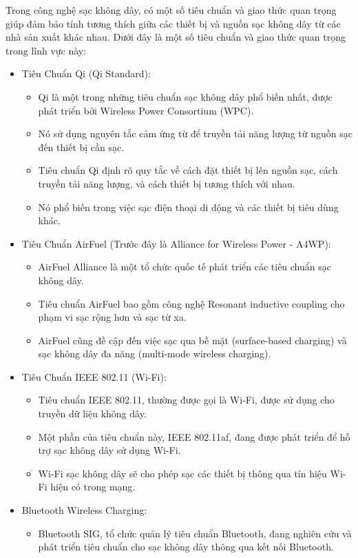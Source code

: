 \documentclass{article} %
\begin{document}
Trong công nghệ sạc không dây, có một số tiêu chuẩn và giao thức quan trọng giúp đảm bảo tính tương thích giữa các thiết bị và nguồn sạc không dây từ các nhà sản xuất khác nhau. Dưới đây là một số tiêu chuẩn và giao thức quan trọng trong lĩnh vực này:
\begin{itemize}
\item Tiêu Chuẩn Qi (Qi Standard):
\begin{itemize}
    \item Qi là một trong những tiêu chuẩn sạc không dây phổ biến nhất, được phát triển bởi Wireless Power Consortium (WPC).
\item Nó sử dụng nguyên tắc cảm ứng từ để truyền tải năng lượng từ nguồn sạc đến thiết bị cần sạc.
\item Tiêu chuẩn Qi định rõ quy tắc về cách đặt thiết bị lên nguồn sạc, cách truyền tải năng lượng, và cách thiết bị tương thích với nhau.
\item Nó phổ biến trong việc sạc điện thoại di động và các thiết bị tiêu dùng khác.
\end{itemize}
\item Tiêu Chuẩn AirFuel (Trước đây là Alliance for Wireless Power - A4WP):
\begin{itemize}
    \item AirFuel Alliance là một tổ chức quốc tế phát triển các tiêu chuẩn sạc không dây.
\item Tiêu chuẩn AirFuel bao gồm công nghệ Resonant inductive coupling cho phạm vi sạc rộng hơn và sạc từ xa.
\item AirFuel cũng đề cập đến việc sạc qua bề mặt (surface-based charging) và sạc không dây đa năng (multi-mode wireless charging).
\end{itemize}
\item Tiêu Chuẩn IEEE 802.11 (Wi-Fi):
\begin{itemize}
    \item Tiêu chuẩn IEEE 802.11, thường được gọi là Wi-Fi, được sử dụng cho truyền dữ liệu không dây.
\item Một phần của tiêu chuẩn này, IEEE 802.11af, đang được phát triển để hỗ trợ sạc không dây sử dụng Wi-Fi.
\item Wi-Fi sạc không dây sẽ cho phép sạc các thiết bị thông qua tín hiệu Wi-Fi hiện có trong mạng.
\end{itemize}
\item Bluetooth Wireless Charging:
    \begin{itemize}
        \item Bluetooth SIG, tổ chức quản lý tiêu chuẩn Bluetooth, đang nghiên cứu và phát triển tiêu chuẩn cho sạc không dây thông qua kết nối Bluetooth.

\end{itemize}
\end{itemize}
\end{document}
